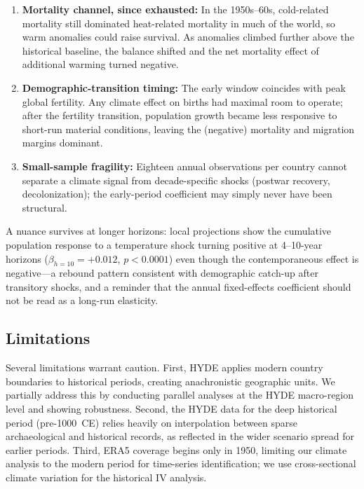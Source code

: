 \documentclass[12pt,letterpaper]{article}
\begin{document}
\begin{enumerate}[nosep]
  \item \textbf{Mortality channel, since exhausted:} In the 1950s--60s, cold-related mortality still dominated heat-related mortality in much of the world, so warm anomalies could raise survival. As anomalies climbed further above the historical baseline, the balance shifted and the net mortality effect of additional warming turned negative.
  \item \textbf{Demographic-transition timing:} The early window coincides with peak global fertility. Any climate effect on births had maximal room to operate; after the fertility transition, population growth became less responsive to short-run material conditions, leaving the (negative) mortality and migration margins dominant.
  \item \textbf{Small-sample fragility:} Eighteen annual observations per country cannot separate a climate signal from decade-specific shocks (postwar recovery, decolonization); the early-period coefficient may simply never have been structural.
\end{enumerate}

A nuance survives at longer horizons: local projections show the cumulative population response to a temperature shock turning positive at 4--10-year horizons ($\beta_{h=10} = +0.012$, $p < 0.0001$) even though the contemporaneous effect is negative---a rebound pattern consistent with demographic catch-up after transitory shocks, and a reminder that the annual fixed-effects coefficient should not be read as a long-run elasticity.

\subsection{Limitations}

Several limitations warrant caution. First, HYDE applies modern country boundaries to historical periods, creating anachronistic geographic units. We partially address this by conducting parallel analyses at the HYDE macro-region level and showing robustness. Second, the HYDE data for the deep historical period (pre-1000~CE) relies heavily on interpolation between sparse archaeological and historical records, as reflected in the wider scenario spread for earlier periods. Third, ERA5 coverage begins only in 1950, limiting our climate analysis to the modern period for time-series identification; we use cross-sectional climate variation for the historical IV analysis.
\end{document}
